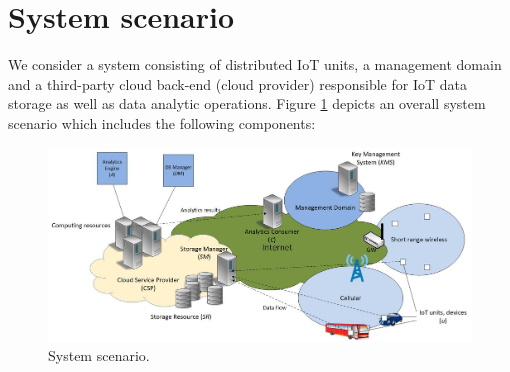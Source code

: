 {\section{System scenario}
\label{Systemscenario}
We consider a system consisting of distributed IoT units, a management domain and a third-party cloud back-end (cloud provider) responsible for IoT data storage as well as data analytic operations.  Figure \ref{fig:systemarchitecture} depicts an overall system scenario which includes the following components: 

\begin{figure}[th]
    \begin{centering}
    \includegraphics[width=\textwidth]{papers/ppiot/images/SystemArch}
    \caption{System scenario.}
    \label{fig:systemarchitecture}
    \end{centering}
\end{figure}

}
